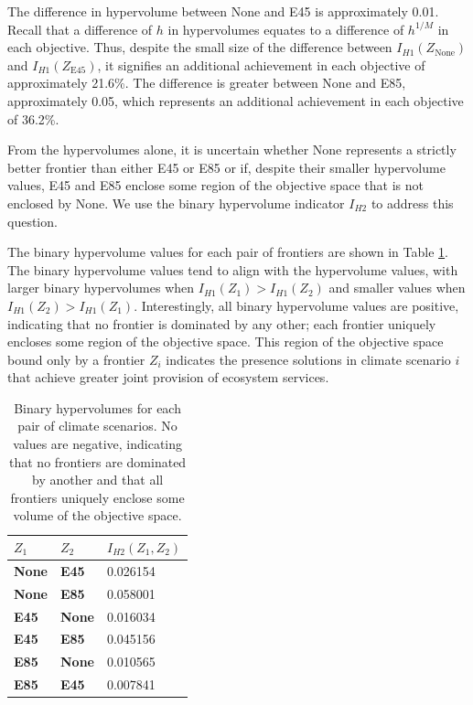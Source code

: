 The difference in hypervolume between None and E45 is approximately 0.01. Recall that a difference of $h$ in hypervolumes equates to a difference of $h^{1/M}$ in each objective. Thus, despite the small size of the difference between $I_{H1}(Z_\text{None})$ and $I_{H1}(Z_\text{E45})$, it signifies an additional achievement in each objective of approximately 21.6\%. The difference is greater between None and E85, approximately 0.05, which represents an additional achievement in each objective of 36.2\%.

From the hypervolumes alone, it is uncertain whether None represents a strictly better frontier than either E45 or E85 or if, despite their smaller hypervolume values, E45 and E85 enclose some region of the objective space that is not enclosed by None. We use the binary hypervolume indicator $I_{H2}$ to address this question.

The binary hypervolume values for each pair of frontiers are shown in Table \ref{tab:binaryHypervols}. The binary hypervolume values tend to align with the hypervolume values, with larger binary hypervolumes when $I_{H1}(Z_1) > I_{H1}(Z_2)$ and smaller values when $I_{H1}(Z_2) > I_{H1}(Z_1)$. Interestingly, all binary hypervolume values are positive, indicating that no frontier is dominated by any other; each frontier uniquely encloses some region of the objective space. This region of the objective space bound only by a frontier $Z_i$ indicates the presence solutions in climate scenario $i$ that achieve greater joint provision of ecosystem services.%

\begin{table}[]
\centering
\caption[Binary hypervolume values for each pair of climate scenarios]{Binary hypervolumes for each pair of climate scenarios. No values are negative, indicating that no frontiers are dominated by another and that all frontiers uniquely enclose some volume of the objective space.}
\label{tab:binaryHypervols}
\begin{tabular}{ll|l}
\textbf{$Z_1$} & \textbf{$Z_2$} & \textbf{$I_{H2}(Z_1,Z_2)$} \\ \hline
\textbf{None}  & \textbf{E45}   & 0.026154                   \\
\textbf{None}  & \textbf{E85}   & 0.058001                   \\
\textbf{E45}   & \textbf{None}  & 0.016034                   \\
\textbf{E45}   & \textbf{E85}   & 0.045156                   \\
\textbf{E85}   & \textbf{None}  & 0.010565                   \\
\textbf{E85}   & \textbf{E45}   & 0.007841                  
\end{tabular}
\end{table}

